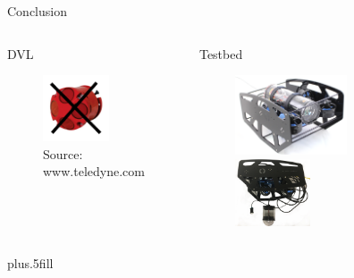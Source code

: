 \documentclass{beamer}
\begin{document}
\begin{frame}{Conclusion}
\begin{columns}
	\begin{block}{DVL}
		\begin{figure}
			\includegraphics[width = 0.65\textwidth]{Images/DVL_no.png}\\
			\tiny {\color{blue} Source: www.teledyne.com}
		\end{figure}
	\end{block}
	\pause
		\begin{block}{Testbed}
		\begin{figure}
			\includegraphics[width = 0.6\textwidth]{Images/Bluerov_modif.png}
			\includegraphics[width = 0.4\textwidth]{Images/I3S_UAV.png}
		\end{figure}
	\end{block}
	
	

	\end{columns}
  
  \vskip0pt plus.5fill

\end{frame}
\end{document}
